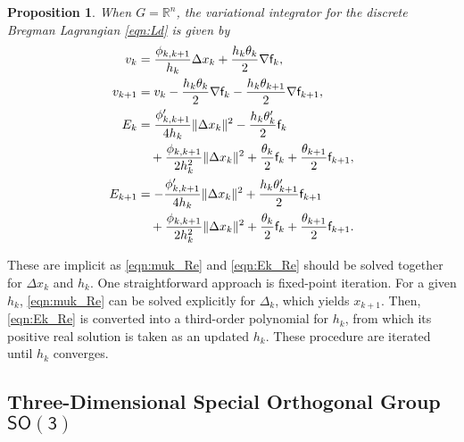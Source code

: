 \documentclass[letterpaper, 10pt, conference]{ieeeconf}
\newcommand{\SO}{\ensuremath{\mathsf{SO(3)}}}
\renewcommand{\Re}{\ensuremath{\mathbb{R}}}
\newtheorem{prop}{Proposition}
\begin{document}
\begin{prop}
    When $G=\Re^n$, the variational integrator for the discrete Bregman Lagrangian \eqref{eqn:Ld} is given by 
\begin{align}
    v_k & =  \frac{\phi_{k,k+1}}{h_k}\Delta x_k + \frac{h_k\theta_k}{2} \nabla \mathsf{f}_k,\label{eqn:muk_Re} \\
    v_{k+1} & = v_k - \frac{h_k\theta_k}{2} \nabla\mathsf{f}_k  -\frac{h_k\theta_{k+1}}{2} \nabla \mathsf{f}_{k+1},  \label{eqn:mukp_Re}\\
    E_{k} & = \frac{\phi'_{k,k+1}}{ 4 h_k} \|\Delta x_k\|^2 -\frac{h_k\theta'_{k}}{2} \mathsf{f}_{k} \nonumber\\\
          & \quad + \frac{\phi_{k,k+1}}{2 h_k^2}\|\Delta x_k\|^2 + \frac{\theta_k}{2}\mathsf{f}_k + \frac{\theta_{k+1}}{2}\mathsf{f}_{k+1},\label{eqn:Ek_Re}\\
    E_{k+1} & = -\frac{\phi'_{k,k+1}}{ 4 h_k} \|\Delta x_k\|^2 +\frac{h_k\theta'_{k+1}}{2} \mathsf{f}_{k+1}\nonumber \\\
            & \quad + \frac{\phi_{k,k+1}}{2 h_k^2}\|\Delta x_k\|^2 +\frac{\theta_k}{2}\mathsf{f}_k + \frac{\theta_{k+1}}{2}\mathsf{f}_{k+1}.
\end{align}
\end{prop}
These are implicit as \eqref{eqn:muk_Re} and \eqref{eqn:Ek_Re} should be solved together for $\Delta x_k$ and $h_k$.
One straightforward approach is fixed-point iteration.
For a given $h_k$, \eqref{eqn:muk_Re} can be solved explicitly for $\Delta_k$, which yields $x_{k+1}$. 
Then, \eqref{eqn:Ek_Re} is converted into a third-order polynomial for $h_k$, from which its positive real solution is taken as an updated $h_k$. 
These procedure are iterated until $h_k$ converges. 

\subsection{Three-Dimensional Special Orthogonal Group $\SO$}
\end{document}
